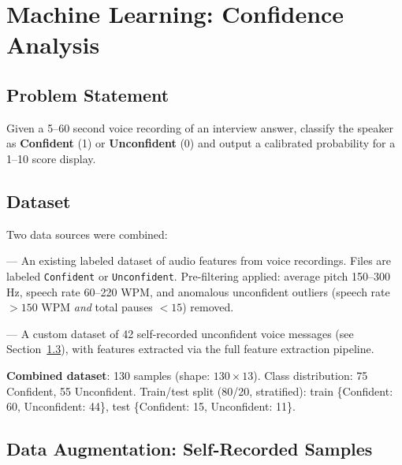 \documentclass[12pt,a4paper]{article}
\begin{document}
\section{Machine Learning: Confidence Analysis}

\subsection{Problem Statement}

Given a 5--60 second voice recording of an interview answer, classify the speaker as \textbf{Confident} (1) or \textbf{Unconfident} (0) and output a calibrated probability for a 1--10 score display.

\subsection{Dataset}
\label{sec:dataset}

Two data sources were combined:

\begin{description}[leftmargin=2em]
  \item[\texttt{audio\_features V3.csv}] --- An existing labeled dataset of audio features from voice recordings. Files are labeled \texttt{Confident} or \texttt{Unconfident}. Pre-filtering applied: average pitch 150--300 Hz, speech rate 60--220 WPM, and anomalous unconfident outliers (speech rate $>150$ WPM \textit{and} total pauses $<15$) removed.
  \item[\texttt{unconfident\_features.csv}] --- A custom dataset of 42 self-recorded unconfident voice messages (see Section~\ref{sec:augmentation}), with features extracted via the full feature extraction pipeline.
\end{description}

\textbf{Combined dataset}: 130 samples (shape: $130 \times 13$). Class distribution: 75 Confident, 55 Unconfident. Train/test split (80/20, stratified): train \{Confident: 60, Unconfident: 44\}, test \{Confident: 15, Unconfident: 11\}.

\subsection{Data Augmentation: Self-Recorded Samples}
\label{sec:augmentation}
\end{document}
